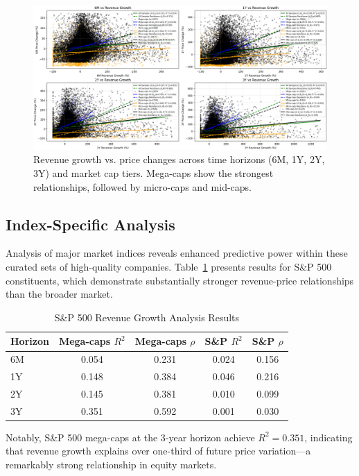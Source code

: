 \documentclass[11pt]{article}
\begin{document}
\begin{figure}[!htbp]
\centering
\includegraphics[width=\textwidth]{images/all_horizons_all_stocks_single_plot.png}
\caption{Revenue growth vs. price changes across time horizons (6M, 1Y, 2Y, 3Y) and market cap tiers. Mega-caps show the strongest relationships, followed by micro-caps and mid-caps.}
\label{fig:revenue-by-cap}
\end{figure}

\subsection{Index-Specific Analysis}

Analysis of major market indices reveals enhanced predictive power within these curated sets of high-quality companies. Table~\ref{tab:index-results} presents results for S\&P 500 constituents, which demonstrate substantially stronger revenue-price relationships than the broader market.

\begin{table}[!htbp]
\centering
\caption{S\&P 500 Revenue Growth Analysis Results}
\label{tab:index-results}
\begin{tabular}{lcccc}
\toprule
Horizon & Mega-caps $R^2$ & Mega-caps $\rho$ & S\&P $R^2$ & S\&P $\rho$ \\
\midrule
6M & 0.054 & 0.231 & 0.024 & 0.156 \\
1Y & 0.148 & 0.384 & 0.046 & 0.216 \\
2Y & 0.145 & 0.381 & 0.010 & 0.099 \\
3Y & 0.351 & 0.592 & 0.001 & 0.030 \\
\bottomrule
\end{tabular}
\end{table}

\vspace{1em}
\FloatBarrier

Notably, S\&P 500 mega-caps at the 3-year horizon achieve $R^2 = 0.351$, indicating that revenue growth explains over one-third of future price variation—a remarkably strong relationship in equity markets.
\end{document}
